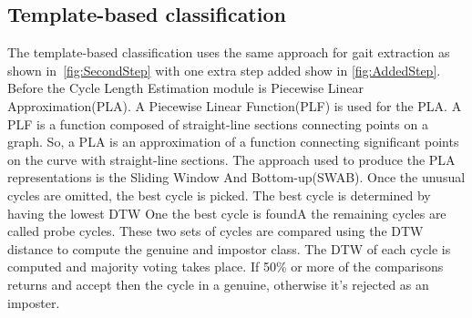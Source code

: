 \documentclass{sig-alternate}
\begin{document}
\subsection{Template-based classification}
	The template-based classification uses the same approach for gait extraction as shown in~\ref{fig:SecondStep} with one extra step added show in \ref{fig:AddedStep}. Before the Cycle Length Estimation module is Piecewise Linear Approximation(PLA). A Piecewise Linear Function(PLF) is used for the PLA. A PLF is a function composed of straight-line sections connecting points on a graph. So, a PLA is an approximation of a function connecting significant points on the curve with straight-line sections. The approach used to produce the PLA representations is the
Sliding Window And Bottom-up(SWAB). Once the unusual cycles are omitted, the best cycle is picked. The best cycle is determined by having the lowest DTW 
One the best cycle is foundA the remaining cycles are called probe cycles. These two sets of cycles are compared using the DTW distance to compute the genuine and impostor class. The DTW of each cycle is computed and majority voting takes place. If 50\% or more of the comparisons returns and accept then the cycle in a genuine, otherwise it's rejected as an imposter. 
\end{document}

